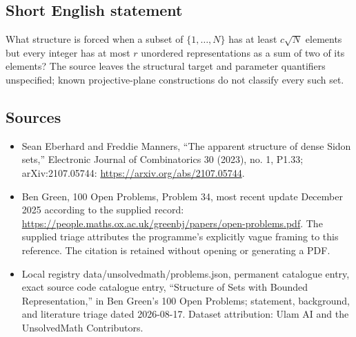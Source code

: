 \documentclass[11pt]{article}
\begin{document}
\subsection{Short English statement}
What structure is forced when a subset of $\{1,\ldots,N\}$ has at least $c\sqrt N$ elements but every integer has at most $r$ unordered representations as a sum of two of its elements? The source leaves the structural target and parameter quantifiers unspecified; known projective-plane constructions do not classify every such set.
\subsection{Sources}
\begin{itemize}
\item Sean Eberhard and Freddie Manners, ``The apparent structure of dense Sidon sets,'' Electronic Journal of Combinatorics 30 (2023), no. 1, P1.33; arXiv:2107.05744: \url{https://arxiv.org/abs/2107.05744}.
\item Ben Green, 100 Open Problems, Problem 34, most recent update December 2025 according to the supplied record: \url{https://people.maths.ox.ac.uk/greenbj/papers/open-problems.pdf}. The supplied triage attributes the programme's explicitly vague framing to this reference. The citation is retained without opening or generating a PDF.
\item Local registry data/unsolvedmath/problems.json, permanent catalogue entry, exact source code catalogue entry, ``Structure of Sets with Bounded Representation,'' in Ben Green's 100 Open Problems; statement, background, and literature triage dated 2026-08-17. Dataset attribution: Ulam AI and the UnsolvedMath Contributors.
\end{itemize}
\end{document}

